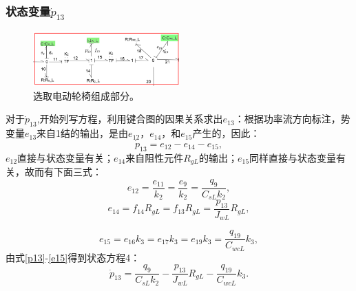 \subsubsection{状态变量$\dot{ p}_{13} $}
\begin{figure}[H]
	\centering
	\includegraphics[width=0.5\textwidth]{fig/equation4.png}
	\caption{选取电动轮椅组成部分。}\label{fig:equation4}
\end{figure}
对于$\dot{p} _ { 13 }$,开始列写方程，利用键合图的因果关系求出$e_{13}$：根据功率流方向标注，势变量$e_{13}$来自1结的输出，是由$e_{12}$，$e_{14}$，和$e_{15}$产生的，因此：
\begin{equation}\label{p13}
\dot{ p } _ { 13 } = e _ { 12 } - e _ { 14 } - e _ { 15 },
\end{equation}
$e_{12}$直接与状态变量有关；$e_{14}$来自阻性元件$R _ { gL }$的输出；$e_{15}$同样直接与状态变量有关，故而有下面三式：
\begin{equation}
e _ { 12 } = \frac { e _ { 11 } } { k _ { 2 } } = \frac { e _ { 9 } } { k _ { 2 } } = \frac { q _ { 9 } } { C _ { sL  } k _ { 2 } },
\end{equation}
\begin{equation}
e _ { 14 } = f _ { 14 } R _ { gL}  = f _ { 13 } R _ { gL}  = \frac { p _ { 13 } } { J _ { wL}  } R _ { gL } ,
\end{equation}

\begin{equation}\label{e15}
e _ { 15 } = e _ { 16 } k _ { 3 } = e _ { 17 } k _ { 3 } = e _ { 19 } k _ { 3 } = \frac { q _ { 19 } } { C _ { w cL }  } k _ { 3 } ,
\end{equation}
由式\ref{p13}-\ref{e15}得到状态方程4：
\begin{equation}
\dot{ p }_ { 13 } = \frac { q _ { 9 } } { C _ { sL}  k _ { 2 } } - \frac { p _ { 13 } } { J _ { wL}  } R _ { gL }  - \frac { q _ { 19 } } { C _ { w cL}  } k _ { 3 }.
\end{equation}
